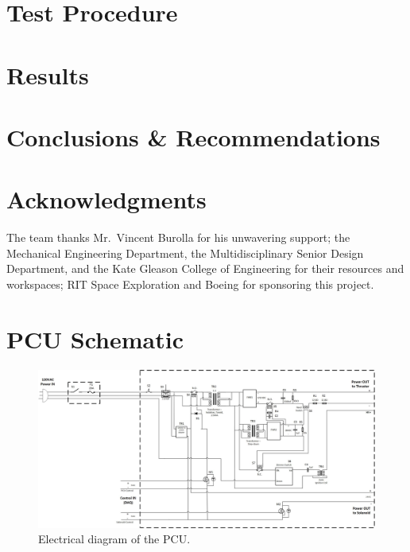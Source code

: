 \documentclass[journal]{IEEEtran}
\begin{document}

\section{Test Procedure}

\section{Results}

\section{Conclusions \& Recommendations}

\section*{Acknowledgments}
The team thanks Mr.~Vincent Burolla for his unwavering support; the Mechanical Engineering Department, the Multidisciplinary Senior Design Department, and the Kate Gleason College of Engineering for their resources and workspaces; RIT Space Exploration and Boeing for sponsoring this project.





\onecolumn
\appendices{}
\section{PCU Schematic}
\begin{figure}[h!]
  \includegraphics[angle=90,height=.9\vsize,keepaspectratio]{figs/PCU.jpg}
  \caption{Electrical diagram of the PCU.}
\label{fig:pcu-schematic}
\end{figure}
\end{document}
